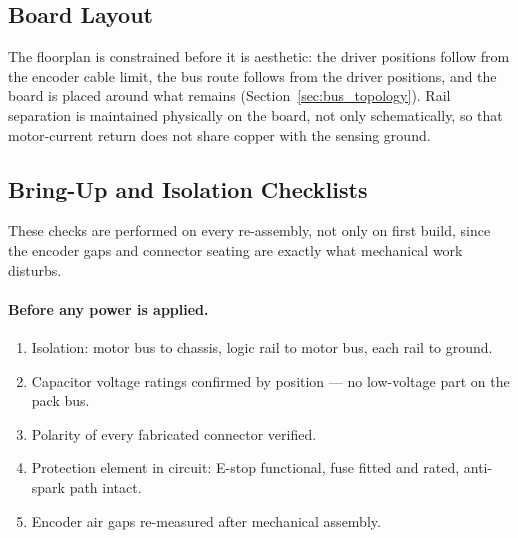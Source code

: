 
\subsection{Board Layout}
\label{app:board_layout}


The floorplan is constrained before it is aesthetic: the driver positions follow
from the encoder cable limit, the bus route follows from the driver positions,
and the board is placed around what remains
(Section~\ref{sec:bus_topology}). Rail separation is maintained physically on
the board, not only schematically, so that motor-current return does not share
copper with the sensing ground.

\subsection{Bring-Up and Isolation Checklists}
\label{app:checklists}

These checks are performed on every re-assembly, not only on first build, since
the encoder gaps and connector seating are exactly what mechanical work
disturbs.

\paragraph{Before any power is applied.}
\begin{enumerate}
  \item Isolation: motor bus to chassis, logic rail to motor bus, each rail to
        ground.
  \item Capacitor voltage ratings confirmed by position --- no low-voltage part
        on the pack bus.
  \item Polarity of every fabricated connector verified.
  \item Protection element in circuit: E-stop functional, fuse fitted and rated,
        anti-spark path intact.
  \item Encoder air gaps re-measured after mechanical assembly.
\end{enumerate}

